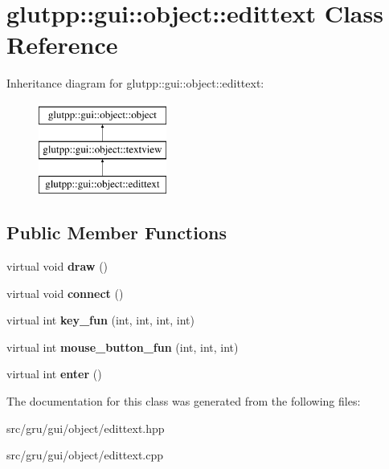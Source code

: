 \hypertarget{classglutpp_1_1gui_1_1object_1_1edittext}{\section{glutpp\-:\-:gui\-:\-:object\-:\-:edittext \-Class \-Reference}
\label{classglutpp_1_1gui_1_1object_1_1edittext}
}
\-Inheritance diagram for glutpp\-:\-:gui\-:\-:object\-:\-:edittext\-:\begin{figure}[H]
\begin{center}
\leavevmode
\includegraphics[height=3.000000cm]{classglutpp_1_1gui_1_1object_1_1edittext}
\end{center}
\end{figure}
\subsection*{\-Public \-Member \-Functions}
\begin{DoxyCompactItemize}
\item 
\hypertarget{classglutpp_1_1gui_1_1object_1_1edittext_a6667510174711dd4718f8f8b07b89a6e}{virtual void {\bfseries draw} ()}\label{classglutpp_1_1gui_1_1object_1_1edittext_a6667510174711dd4718f8f8b07b89a6e}

\item 
\hypertarget{classglutpp_1_1gui_1_1object_1_1edittext_aacbbfc6f239db6356d83de334f6b0bdc}{virtual void {\bfseries connect} ()}\label{classglutpp_1_1gui_1_1object_1_1edittext_aacbbfc6f239db6356d83de334f6b0bdc}

\item 
\hypertarget{classglutpp_1_1gui_1_1object_1_1edittext_a88d4a62bd971978e1b60711859b4390d}{virtual int {\bfseries key\-\_\-fun} (int, int, int, int)}\label{classglutpp_1_1gui_1_1object_1_1edittext_a88d4a62bd971978e1b60711859b4390d}

\item 
\hypertarget{classglutpp_1_1gui_1_1object_1_1edittext_ae7decbc3c95b939cd78d782c48702bec}{virtual int {\bfseries mouse\-\_\-button\-\_\-fun} (int, int, int)}\label{classglutpp_1_1gui_1_1object_1_1edittext_ae7decbc3c95b939cd78d782c48702bec}

\item 
\hypertarget{classglutpp_1_1gui_1_1object_1_1edittext_a654792733884b42cba054e6a84894876}{virtual int {\bfseries enter} ()}\label{classglutpp_1_1gui_1_1object_1_1edittext_a654792733884b42cba054e6a84894876}

\end{DoxyCompactItemize}


\-The documentation for this class was generated from the following files\-:\begin{DoxyCompactItemize}
\item 
src/gru/gui/object/edittext.\-hpp\item 
src/gru/gui/object/edittext.\-cpp\end{DoxyCompactItemize}
